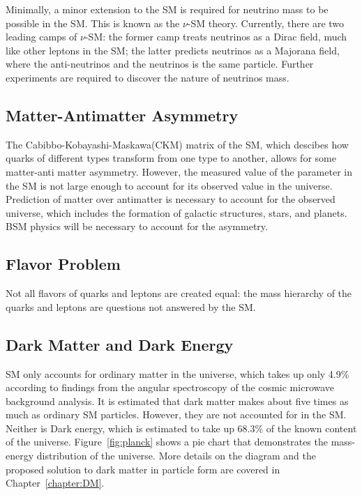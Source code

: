 Minimally, a minor extension to the SM is required for neutrino mass to be possible in the SM. This is known as the $\nu$-SM theory. Currently, there are two leading camps of $\nu$-SM: the former camp treats neutrinos as a Dirac field, much like other leptons in the SM; the latter predicts neutrinos as a Majorana field, where the anti-neutrinos and the neutrinos is the same particle. Further experiments are required to discover the nature of neutrinos mass. 



\subsection{Matter-Antimatter Asymmetry}
The Cabibbo-Kobayashi-Maskawa(CKM) matrix of the SM, which descibes how quarks of different types transform from one type to another, allows for some matter-anti matter asymmetry. However, the measured value of the parameter in the SM is not large enough to account for its observed value in the universe. Prediction of matter over antimatter is necessary to account for the observed universe, which includes the formation of galactic structures, stars, and planets. BSM physics will be necessary to account for the asymmetry. 

\subsection{Flavor Problem}
Not all flavors of quarks and leptons are created equal: the mass hierarchy of the quarks and leptons are questions not answered by the SM.

\subsection{Dark Matter and Dark Energy}
SM only accounts for ordinary matter in the universe, which takes up only 4.9\% according to findings from the angular spectroscopy of the cosmic microwave background analysis. It is estimated that dark matter makes about five times as much as ordinary SM particles. However, they are not accounted for in the SM.
Neither is Dark energy, which is estimated to take up 68.3\% of the known content of the universe. Figure~\ref{fig:planck} shows a pie chart that demonstrates the mass-energy distribution of the universe. More details on the diagram and the proposed solution to dark matter in particle form are covered in Chapter~\ref{chapter:DM}.

